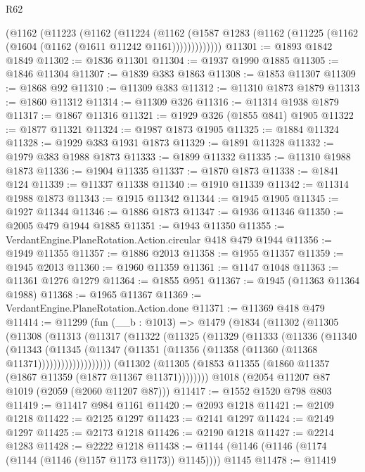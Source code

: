 \begin{lexlean}{R62}
\begin{coremodule}
      (@1162
        (@11223
          (@1162
            (@11224
              (@1162
                (@1587 @1283 (@1162 (@11225 (@1162 (@1604 (@1162 (@1611 @11242 @1161)))))))))))))
@11301 := @1893 @1842 @1849
@11302 := @1836 @11301
@11304 := @1937 @1990 @1885
@11305 := @1846 @11304
@11307 := @1839 @383 @1863
@11308 := @1853 @11307
@11309 := @1868 @92
@11310 := @11309 @383
@11312 := @11310 @1873 @1879
@11313 := @1860 @11312
@11314 := @11309 @326
@11316 := @11314 @1938 @1879
@11317 := @1867 @11316
@11321 := @1929 @326 (@1855 @841) @1905
@11322 := @1877 @11321
@11324 := @1987 @1873 @1905
@11325 := @1884 @11324
@11328 := @1929 @383 @1931 @1873
@11329 := @1891 @11328
@11332 := @1979 @383 @1988 @1873
@11333 := @1899 @11332
@11335 := @11310 @1988 @1873
@11336 := @1904 @11335
@11337 := @1870 @1873
@11338 := @1841 @124
@11339 := @11337 @11338
@11340 := @1910 @11339
@11342 := @11314 @1988 @1873
@11343 := @1915 @11342
@11344 := @1945 @1905
@11345 := @1927 @11344
@11346 := @1886 @1873
@11347 := @1936 @11346
@11350 := @2005 @479 @1944 @1885
@11351 := @1943 @11350
@11355 := VerdantEngine.PlaneRotation.Action.circular @418 @479 @1944
@11356 := @1949 @11355
@11357 := @1886 @2013
@11358 := @1955 @11357
@11359 := @1945 @2013
@11360 := @1960 @11359
@11361 := @1147 @1048
@11363 := @11361 @1276 @1279
@11364 := @1855 @951
@11367 := @1945 (@11363 @11364 @1988)
@11368 := @1965 @11367
@11369 := VerdantEngine.PlaneRotation.Action.done
@11371 := @11369 @418 @479
@11414 := @11299
    (fun (__b : @1013) =>
    @1479
      (@1834
        (@11302
          (@11305
            (@11308
              (@11313
                (@11317
                  (@11322
                    (@11325
                      (@11329
                        (@11333
                          (@11336
                            (@11340
                              (@11343
                                (@11345
                                  (@11347
                                    (@11351
                                      (@11356 (@11358 (@11360 (@11368 @11371)))))))))))))))))))
        (@11302 (@11305 (@1853 @11355 (@1860 @11357 (@1867 @11359 (@1877 @11367 @11371))))))))
    @1018
    (@2054 @11207 @87 @1019 (@2059 (@2060 @11207 @87)))
@11417 := @1552 @1520 @798 @803
@11419 := @11417 @984 @1161
@11420 := @2093 @1218
@11421 := @2109 @1218
@11422 := @2125 @1297
@11423 := @2141 @1297
@11424 := @2149 @1297
@11425 := @2173 @1218
@11426 := @2190 @1218
@11427 := @2214 @1283
@11428 := @2222 @1218
@11438 := @1144 (@1146 (@1146 (@1174 (@1144 (@1146 (@1157 @1173 @1173)) @1145)))) @1145
@11478 := @11419

\end{coremodule}
\end{lexlean}
